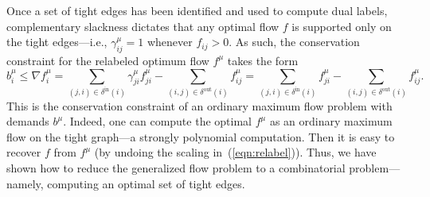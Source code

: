 \documentclass[11pt]{article}
\makeatletter
\let\comment\todo
\newcommand{\david}[1]{\comment[nolist,color=orange!40]{@david\\ #1}}
\theoremstyle{definition}
\theoremstyle{definition}
\theoremstyle{definition}
\newcommand{\fu}{f^{\mu}}
\newcommand{\nfiu}{\nabla \fu_i}
\newcommand{\biu}{b_{i}^{\mu}}
\newcommand{\giij}{\gamma_{ij}^{\mu}}
\newcommand{\din}{\delta^{\text{in}}}
\newcommand{\dout}{\delta^{\text{out}}}
\renewcommand{\todo}[1]{\hl{TODO: #1}}
\makeatother
\begin{document}
	
	Once a set of tight edges has been identified and used to compute dual labels,
    complementary slackness dictates that any optimal flow $f$ is supported only on
    the tight edges---i.e., $\giij = 1$ 
    whenever $f_{ij} > 0$. As such, the conservation
    constraint for the relabeled optimum flow $f^\mu$ takes the form
    \[ \biu \leq \nfiu
    = \sum_{(j,i) \in \din(i)} \gamma_{ji}^{\mu} \fu_{ji} - \sum_{(i,j) \in \dout(i)} \fu_{ij}
    = \sum_{(j,i) \in \din(i)} \fu_{ji} - \sum_{(i,j) \in \dout(i)} \fu_{ij}. \]
    This is the conservation constraint of an ordinary maximum flow problem with demands
    $b^\mu$. Indeed, one can compute the optimal $f^\mu$ as an
    ordinary maximum flow on the tight graph---a strongly polynomial computation.
	Then it is easy to recover $f$ from $f^\mu$ (by undoing the scaling in~(\ref{eqn:relabel})).
	Thus, we have shown how to reduce the generalized
    flow problem to a combinatorial problem---namely, computing an optimal set of tight edges.
    
\end{document}
